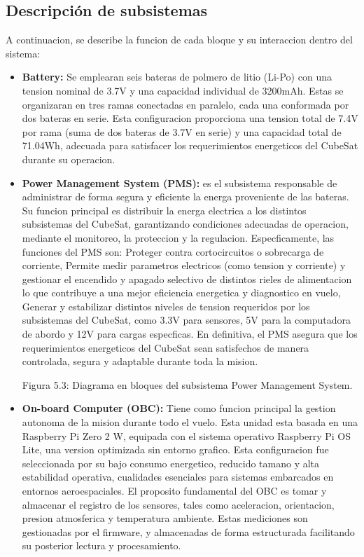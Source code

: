   \subsection{Descripción de subsistemas}
    A continuacion, se describe la funcion de cada bloque y su interaccion dentro del sistema:
    \begin{itemize}
      \item \textbf{Battery:} Se emplearan seis bateras de polmero de litio (Li-Po) con una tension nominal de 3.7V
      y una capacidad individual de 3200mAh. Estas se organizaran en tres ramas
      conectadas en paralelo, cada una conformada por dos bateras en serie. Esta configuracion proporciona una tension total de 7.4V por rama (suma de dos bateras de 3.7V en
      serie) y una capacidad total de 71.04Wh, adecuada para satisfacer los requerimientos
      energeticos del CubeSat durante su operacion.

      \item \textbf{Power Management System (PMS):} es el subsistema responsable de administrar
      de forma segura y eficiente la energa proveniente de las bateras. Su funcion principal es
      distribuir la energa electrica a los distintos subsistemas del CubeSat, garantizando condiciones adecuadas de operacion, mediante el monitoreo, la proteccion y la regulacion.
      Especficamente, las funciones del PMS son:
      Proteger contra cortocircuitos o sobrecarga de corriente,
      Permite medir parametros electricos (como tension y corriente) y gestionar el
      encendido y apagado selectivo de distintos rieles de alimentacion lo que contribuye
      a una mejor eficiencia energetica y diagnostico en vuelo,
      Generar y estabilizar distintos niveles de tension requeridos por los subsistemas
      del CubeSat, como 3.3V para sensores, 5V para la computadora de abordo y 12V
      para cargas especficas.
      En definitiva, el PMS asegura que los requerimientos energeticos del CubeSat sean
      satisfechos de manera controlada, segura y adaptable durante toda la mision.

      Figura 5.3: Diagrama en bloques del subsistema Power Management System.

      \item \textbf{On-board Computer (OBC):} Tiene como funcion principal la gestion autonoma de
      la mision durante todo el vuelo. Esta unidad esta basada en una Raspberry Pi Zero 2
      W, equipada con el sistema operativo Raspberry Pi OS Lite, una version optimizada sin
      entorno grafico. Esta configuracion fue seleccionada por su bajo consumo energetico,
      reducido tamano y alta estabilidad operativa, cualidades esenciales para sistemas embarcados en entornos aeroespaciales.
      El proposito fundamental del OBC es tomar y almacenar el registro de los sensores,
      tales como aceleracion, orientacion, presion atmosferica y temperatura ambiente. Estas
      mediciones son gestionadas por el firmware, y almacenadas de forma estructurada
      facilitando su posterior lectura y procesamiento.


\end{itemize}
